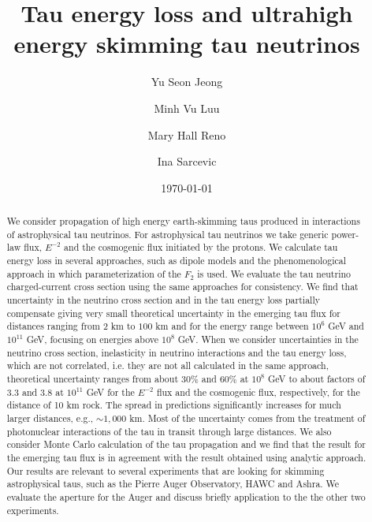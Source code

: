\documentclass[aps,10pt,twocolumn,tightenlines]{revtex4-1}
\begin{document}
\title{Tau energy loss and ultrahigh energy skimming tau neutrinos}

\author{Yu Seon Jeong}
\author{Minh Vu Luu}
\author{Mary Hall Reno}
\author{Ina Sarcevic}
\date{\today}

\begin{abstract}
We consider propagation of high energy earth-skimming taus 
produced in interactions of astrophysical tau neutrinos.  
For astrophysical tau neutrinos we take generic  power-law flux, 
$E^{-2}$ and the cosmogenic flux initiated by the protons.  
We calculate tau energy loss in several approaches, such as 
dipole models and the phenomenological approach in which 
parameterization of the $F_2$ is used.  
We evaluate the tau 
neutrino charged-current cross 
section using the same approaches for consistency.  We find 
that uncertainty in the neutrino cross section and in 
the tau energy loss partially compensate giving very small 
theoretical uncertainty in  the emerging tau flux for 
distances ranging from $2$ km to $100$ km and 
for the energy range between $10^6$ GeV and $10^{11}$ GeV, focusing on energies above $10^8$ GeV.  
When we consider uncertainties in 
the neutrino cross section, inelasticity in neutrino interactions 
and the tau energy loss, 
which are not correlated, i.e. they are not 
all calculated in the same approach, theoretical 
uncertainty ranges from 
about $30\%$ and  $60 \%$ at $10^8$ GeV to about factors of 3.3 and 3.8 
at $10^{11}$ GeV for the $E^{-2}$ flux and the 
 cosmogenic flux, respectively, for the distance of 10 km rock. The spread in predictions significantly increases for
 much larger distances, e.g., $\sim 1,000$ km. Most of the uncertainty comes from the treatment of photonuclear interactions of the tau
 in transit through large distances.
We also consider Monte Carlo calculation of the tau 
propagation and we find that the result for the emerging 
tau flux is in agreement with the result obtained using 
analytic approach.  Our results are relevant to 
several experiments that are looking for skimming 
astrophysical taus, such as the Pierre Auger Observatory, HAWC and Ashra.  
We evaluate the aperture for the Auger and discuss 
briefly application to the the other two experiments.  
\end{abstract} 
\end{document}
